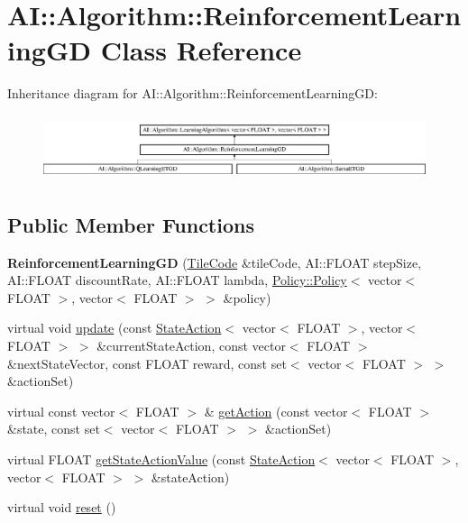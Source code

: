 \hypertarget{classAI_1_1Algorithm_1_1ReinforcementLearningGD}{\section{A\-I\-:\-:Algorithm\-:\-:Reinforcement\-Learning\-G\-D Class Reference}
\label{classAI_1_1Algorithm_1_1ReinforcementLearningGD}
}
Inheritance diagram for A\-I\-:\-:Algorithm\-:\-:Reinforcement\-Learning\-G\-D\-:\begin{figure}[H]
\begin{center}
\leavevmode
\includegraphics[height=1.931035cm]{classAI_1_1Algorithm_1_1ReinforcementLearningGD}
\end{center}
\end{figure}
\subsection*{Public Member Functions}
\begin{DoxyCompactItemize}
\item 
\hypertarget{classAI_1_1Algorithm_1_1ReinforcementLearningGD_a51985e4bd95a874482c4cc378b0fc86e}{{\bfseries Reinforcement\-Learning\-G\-D} (\hyperlink{classAI_1_1Algorithm_1_1TileCode}{Tile\-Code} \&tile\-Code, A\-I\-::\-F\-L\-O\-A\-T step\-Size, A\-I\-::\-F\-L\-O\-A\-T discount\-Rate, A\-I\-::\-F\-L\-O\-A\-T lambda, \hyperlink{classAI_1_1Algorithm_1_1Policy_1_1Policy}{Policy\-::\-Policy}$<$ vector$<$ F\-L\-O\-A\-T $>$, vector$<$ F\-L\-O\-A\-T $>$ $>$ \&policy)}\label{classAI_1_1Algorithm_1_1ReinforcementLearningGD_a51985e4bd95a874482c4cc378b0fc86e}

\item 
virtual void \hyperlink{classAI_1_1Algorithm_1_1ReinforcementLearningGD_afca8d60ac090dec611f3834c0e8872c0}{update} (const \hyperlink{classAI_1_1StateAction}{State\-Action}$<$ vector$<$ F\-L\-O\-A\-T $>$, vector$<$ F\-L\-O\-A\-T $>$ $>$ \&current\-State\-Action, const vector$<$ F\-L\-O\-A\-T $>$ \&next\-State\-Vector, const F\-L\-O\-A\-T reward, const set$<$ vector$<$ F\-L\-O\-A\-T $>$ $>$ \&action\-Set)
\item 
virtual const vector$<$ F\-L\-O\-A\-T $>$ \& \hyperlink{classAI_1_1Algorithm_1_1ReinforcementLearningGD_a97a8fe122f39d0b47a9df496502c2555}{get\-Action} (const vector$<$ F\-L\-O\-A\-T $>$ \&state, const set$<$ vector$<$ F\-L\-O\-A\-T $>$ $>$ \&action\-Set)
\item 
virtual F\-L\-O\-A\-T \hyperlink{classAI_1_1Algorithm_1_1ReinforcementLearningGD_a937edc4d2b11025bccbd450163155660}{get\-State\-Action\-Value} (const \hyperlink{classAI_1_1StateAction}{State\-Action}$<$ vector$<$ F\-L\-O\-A\-T $>$, vector$<$ F\-L\-O\-A\-T $>$ $>$ \&state\-Action)
\item 
virtual void \hyperlink{classAI_1_1Algorithm_1_1ReinforcementLearningGD_ad6f2fa8bc762d6760e9c61a132ccd098}{reset} ()
\end{DoxyCompactItemize}
